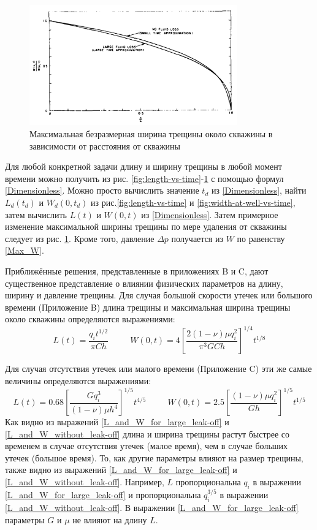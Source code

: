 \documentclass[a4paper, 11pt]{article}
\newcommand{\beq}{\begin{equation}}
\newcommand{\eeq}{\end{equation}}
\begin{document}
\begin{figure}[H]
\center
\includegraphics[width=0.8\textwidth]{maximum_width_vs_distance_from_well}
\caption{Максимальная безразмерная ширина трещины около скважины в зависимости от расстояния от скважины} 
\label{fig:width-vs-distance-from-well}
\end{figure}


Для любой конкретной задачи длину и ширину трещины в любой момент времени можно получить из рис. \ref{fig:length-vs-time}-\ref{fig:width-vs-distance-from-well} с помощью формул \eqref{Dimensionless}.
Можно просто вычислить значение $t_d$ из \eqref{Dimensionless}, найти $L_d(t_d)$ и $W_d(0,t_d)$ из рис.\ref{fig:length-vs-time} и \ref{fig:width-at-well-vs-time}, затем вычислить $L(t)$ и $W(0,t)$ из \eqref{Dimensionless}.
Затем примерное изменение максимальной ширины трещины по мере удаления от скважины следует из рис. \ref{fig:width-vs-distance-from-well}.
Кроме того, давление $\Delta p$ получается из $W$ по равенству \eqref{Max_W}.

Приближённые решения, представленные в приложениях B и C, дают существенное представление о влиянии физических параметров на длину, ширину и давление трещины.
Для случая большой скорости утечек или большого времени (Приложение B) длина трещины и максимальная ширина трещины около скважины определяются выражениями:
\beq\label{L_and_W_for_large_leak-off}
L(t)=\frac{q_i t^{1/2}}{\pi Ch}\,\,\,\,\,\,\,\,\,\,\,\,\,\,\,W(0,t)=4\left[\frac{2(1-\nu)\mu q_i^2}{\pi^3 GCh}\right]^{1/4}t^{1/8}
\eeq

Для случая отсутствия утечек или малого времени (Приложение C) эти же самые величины определяются выражениями:
\beq\label{L_and_W_without_leak-off}
L(t)=0.68\left[\frac{Gq_i^3}{(1-\nu)\mu h^4}\right]^{1/5}t^{4/5}\,\,\,\,\,\,\,\,\,\,\,\,\,\,\,W(0,t)=2.5\left[\frac{(1-\nu)\mu q_i^2}{Gh}\right]^{1/5}t^{1/5}
\eeq
Как видно из выражений \eqref{L_and_W_for_large_leak-off} и \eqref{L_and_W_without_leak-off} длина и ширина трещины растут быстрее со временем в случае отсутствия утечек (малое время), чем в случае больших утечек (большое время).
То, как другие параметры влияют на размер трещины, также видно из выражений \eqref{L_and_W_for_large_leak-off} и \eqref{L_and_W_without_leak-off}.
Например, $L$ пропорциональна $q_i$ в выражении \eqref{L_and_W_for_large_leak-off} и пропорциональна $q_i^{3/5}$ в выражении \eqref{L_and_W_without_leak-off}.
В выражении \eqref{L_and_W_for_large_leak-off} параметры $G$ и $\mu$ не влияют на длину $L$.
\end{document}
